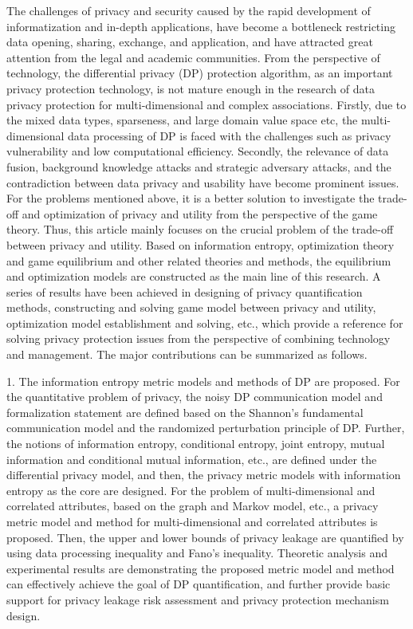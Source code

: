\begin{englishabstract}
The challenges of privacy and security caused by the rapid development of informatization and in-depth applications, have become a bottleneck restricting data opening, sharing, exchange, and application, and have attracted great attention from the legal and academic communities. From the perspective of technology, the differential privacy (DP) protection algorithm, as an important privacy protection technology, is not mature enough in the research of data privacy protection for multi-dimensional and complex associations. Firstly, due to the mixed data types, sparseness, and large domain value space etc, the multi-dimensional data processing of DP is faced with the challenges such as privacy vulnerability and low computational efficiency. Secondly, the relevance of data fusion, background knowledge attacks and strategic adversary attacks, and the contradiction between data privacy and usability have become prominent issues. For the problems mentioned above, it is a better solution to investigate the trade-off and optimization of privacy and utility from the perspective of the game theory. Thus, this article mainly focuses on the crucial problem of the trade-off between privacy and utility. Based on information entropy, optimization theory and game equilibrium and other related theories and methods, the equilibrium and optimization models are constructed as the main line of this research. A series of results have been achieved in designing of privacy quantification methods, constructing and solving game model between privacy and utility, optimization model establishment and solving, etc., which provide a reference for solving privacy protection issues from the perspective of combining technology and management. The major contributions can be summarized as follows.

1. The information entropy metric models and methods of DP are proposed. For the quantitative problem of privacy, the noisy DP communication model and formalization statement are defined based on the Shannon's fundamental communication model and the randomized perturbation principle of DP. Further, the notions of information entropy, conditional entropy, joint entropy, mutual information and conditional mutual information, etc., are defined under the differential privacy model, and then, the privacy metric models with information entropy as the core are designed. For the problem of multi-dimensional and correlated attributes, based on the graph and Markov model, etc., a privacy metric model and method for multi-dimensional and correlated attributes is proposed. Then, the upper and lower bounds of privacy leakage are quantified by using data processing inequality and Fano's inequality. Theoretic analysis and experimental results are demonstrating the proposed metric model and method can effectively achieve the goal of DP quantification, and further provide basic support for privacy leakage risk assessment and privacy protection mechanism design.



\end{englishabstract}
